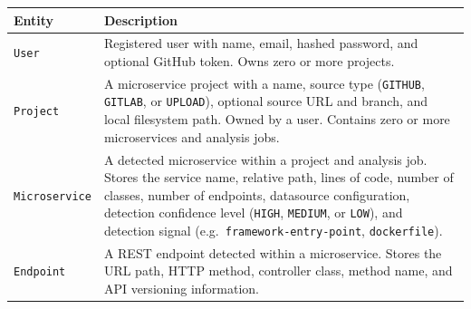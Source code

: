 \begin{table}[htbp]
    \centering
    \footnotesize
    \begin{tabular}{|l|p{9cm}|}
        \hline
        \textbf{Entity}              & \textbf{Description}                                                                                                                                                                                                                                                                                                                                                                                                          \\
        \hline\hline
        \texttt{User}                & Registered user with name, email, hashed password, and optional GitHub token. Owns zero or more projects.                                                                                                                                                                                                                                                                                                                     \\
        \hline
        \texttt{Project}             & A microservice project with a name, source type (\texttt{GITHUB}, \texttt{GITLAB}, or \texttt{UPLOAD}), optional source URL and branch, and local filesystem path. Owned by a user. Contains zero or more microservices and analysis jobs.                                                                                                                                                                                    \\
 \hline
        \texttt{Microservice}        & A detected microservice within a project and analysis job. Stores the service name, relative path, lines of code, number of classes, number of endpoints, datasource configuration, detection confidence level (\texttt{HIGH}, \texttt{MEDIUM}, or \texttt{LOW}), and detection signal (e.g.\ \texttt{framework-entry-point}, \texttt{dockerfile}).                                                                                                                                                                                                                                                        \\
        \hline
        \texttt{Endpoint}            & A REST endpoint detected within a microservice. Stores the URL path, HTTP method, controller class, method name, and API versioning information.                                                                                                                                                                                                                                                                              \\

\end{tabular}
\end{table}
